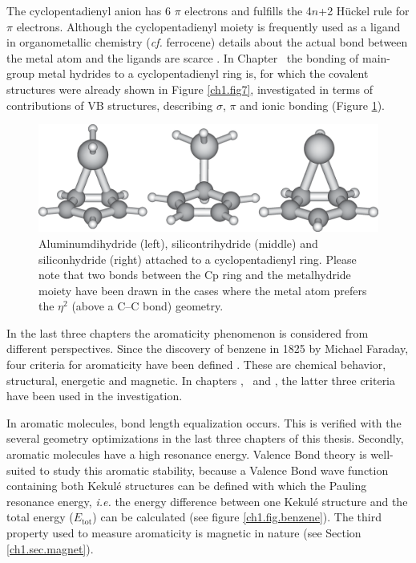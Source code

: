 The cyclopentadienyl anion has 6 $\pi$ electrons and fulfills the 4$n$+2 H\"{u}ckel rule for $\pi$ electrons. Although the cyclopentadienyl moiety is frequently used as a ligand in organometallic chemistry (\textit{cf.} ferrocene) details about the actual bond between the metal atom and the ligands are scarce \cite{budzelaar}. In Chapter \chcyclopentadienyl\ the bonding of main-group metal hydrides to a cyclopentadienyl ring is, for which the covalent structures were already shown in Figure \ref{ch1.fig7}, investigated in terms of contributions of VB structures, describing $\sigma$, $\pi$ and ionic bonding (Figure \ref{ch1.fig.mhydride}).
\begin{figure}[ht]
\center
\includegraphics[scale=0.3]{introduction/figures/mhydride.eps}
\caption{Aluminumdihydride (left), silicontrihydride (middle) and siliconhydride (right) attached to a cyclopentadienyl ring. Please note that two bonds between the Cp ring and the metalhydride moiety have been drawn in the cases where the metal atom prefers the $\eta^2$ (above a C--C bond) geometry.}
\label{ch1.fig.mhydride}
\end{figure}

In the last three chapters the aromaticity phenomenon is considered from different perspectives. Since the discovery of benzene in 1825 by Michael Faraday, four criteria for aromaticity have been defined \cite{aromaticity}. These are chemical behavior, structural, energetic and magnetic. In chapters \chhuckel, \chinorganic\ and \chindacene, the latter three criteria have been used in the investigation. 

In aromatic molecules, bond length equalization occurs. This is verified with the several geometry optimizations in the last three chapters of this thesis. Secondly, aromatic molecules have a high resonance energy. Valence Bond theory is well-suited to study this aromatic stability, because a Valence Bond wave function containing both Kekul\'{e} structures can be defined with which the Pauling resonance energy, \textit{i.e.} the energy difference between one Kekul\'e structure and the total energy ($E_\mathrm{tot}$) can be calculated \cite{pauling5} (see figure \ref{ch1.fig.benzene}). The third property used to measure aromaticity is magnetic in nature (see Section \ref{ch1.sec.magnet}).

